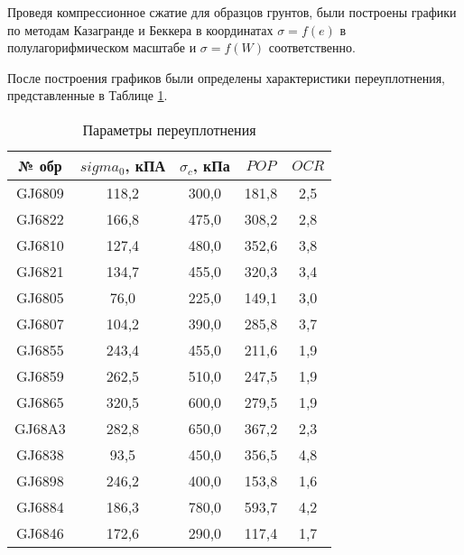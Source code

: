 Проведя компрессионное сжатие для образцов грунтов, были построены 
графики по методам Казагранде и Беккера в координатах $\sigma = f(e)$ 
в полулагорифмическом масштабе и $\sigma = f(W)$ соответственно.

После построения графиков были определены характеристики переуплотнения,
представленные в Таблице \ref{tab:komp}.

\begin{table}[]
  \centering
  \begin{threeparttable}
    \caption{Параметры переуплотнения}\label{tab:komp}
  \begin{tabular}{|c|c|c|c|c|}
  \hline
  № обр  & $sigma_0$, кПА & $\sigma_c$, кПа & $POP$   & $OCR$ \\ \hline
  GJ6809 & 118,2  & 300,0   & 181,8 & 2,5 \\ \hline
  GJ6822 & 166,8  & 475,0   & 308,2 & 2,8 \\ \hline
  GJ6810 & 127,4  & 480,0   & 352,6 & 3,8 \\ \hline
  GJ6821 & 134,7  & 455,0   & 320,3 & 3,4 \\ \hline
  GJ6805 & 76,0   & 225,0   & 149,1 & 3,0 \\ \hline
  GJ6807 & 104,2  & 390,0   & 285,8 & 3,7 \\ \hline
  GJ6855 & 243,4  & 455,0   & 211,6 & 1,9 \\ \hline
  GJ6859 & 262,5  & 510,0   & 247,5 & 1,9 \\ \hline
  GJ6865 & 320,5  & 600,0   & 279,5 & 1,9 \\ \hline
  GJ68A3 & 282,8  & 650,0   & 367,2 & 2,3 \\ \hline
  GJ6838 & 93,5   & 450,0   & 356,5 & 4,8 \\ \hline
  GJ6898 & 246,2  & 400,0   & 153,8 & 1,6 \\ \hline
  GJ6884 & 186,3  & 780,0   & 593,7 & 4,2 \\ \hline
  GJ6846 & 172,6  & 290,0   & 117,4 & 1,7 \\ \hline
  \end{tabular}
\end{threeparttable}
  \end{table}

